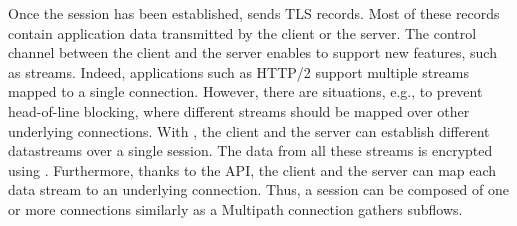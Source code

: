 

Once the \tcpls session has been established, \tcpls sends TLS records. Most of
these records contain application data transmitted by the client or
the server. The control channel between the client and the
server enables \tcpls to support new features, such as streams. Indeed, applications such as HTTP/2 support multiple streams mapped to a single
\tcp connection. However, there are situations, e.g., to prevent head-of-line
blocking, where different streams should be mapped over other underlying \tcp
connections. With \tcpls, the client and the server can establish different
datastreams over a single \tcpls session. The data from all these streams is
encrypted using \tls. Furthermore, thanks to the \tcpls API, the client and the
server can map each data stream to an underlying \tcp connection.
Thus, a \tcpls session can be composed of one or more \tcp connections
similarly as a Multipath \tcp connection gathers subflows. 

